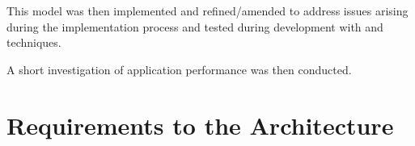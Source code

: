 This model was then implemented and refined/amended to address issues arising during the implementation process and tested during development with  and  techniques.

A short investigation of application performance was then conducted.

\section{Requirements to the Architecture}

